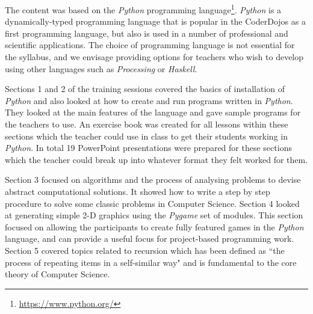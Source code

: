 \documentclass[a4paper]{article}
\begin{document}
The content was based on the \textit{Python} programming language\footnote{\url{https://www.python.org/}}. 
\textit{Python} is a dynamically-typed programming language that is popular in the CoderDojos as a first programming language, but also is used in a number of professional and scientific applications.  The choice of programming language is not essential for the syllabus, and we envisage providing options for teachers who wish to develop using other languages such as \textit{Processing} or \textit{Haskell}.

Sections 1 and 2 of the training sessions covered the basics of installation of \textit{Python} and also looked at how to create and run programs written in \textit{Python}. They looked at the main features of the language and gave sample programs for the teachers to use. 
An exercise book was created for all lessons within these sections which the teacher could use in class to get their students working in \textit{Python}. In total 19 PowerPoint presentations were prepared for these sections which the teacher could break up into whatever format they felt worked for them. 

Section 3 focused on algorithms and the process of analysing problems to devise abstract computational solutions.  It showed how to write a step by step procedure to solve some classic problems in Computer Science. Section 4 looked at generating simple 2-D graphics using the \textit{Pygame} set of modules. This section focused on allowing the participants to create fully featured games in the \textit{Python} language, and can provide a useful focus for project-based programming work.  Section 5 covered topics related to recursion which has been defined as ``the process of repeating items in a self-similar way" and is fundamental to the core theory of Computer Science. \\




\end{document}
